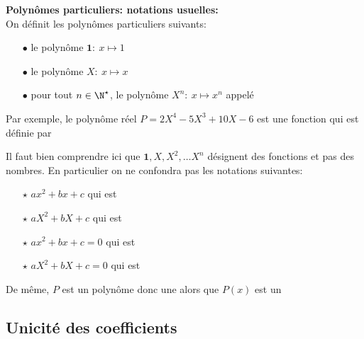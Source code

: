 \documentclass[a4paper, 11pt,reqno]{article}
\begin{document}
{\noindent

\begin{defi} \textbf{Polyn\^omes particuliers: notations usuelles:}\\
	\noindent On d\'efinit les polyn\^omes particuliers suivants:
	\begin{itemize}
		\item[$\bullet$] le polyn\^ome $\mathbf{1}:\ x\mapsto 1$\dotfill \vsec
		\item[$\bullet$] le polyn\^ome $X:\ x\mapsto x$ \dotfill \vsec
		\item[$\bullet$] pour tout $n\in\N^{\star}$, le polyn\^ome $X^n:\ x\mapsto x^n$ appel\'e \dotfill\vsec
	\end{itemize}

\end{defi}

}\vsec

\noindent Par exemple, le polyn\^ome r\'eel $P=2X^4-5X^3+10X-6$ est une fonction qui est d\'efinie par\\\vspace{2cm}


\begin{rem} \noindent \warning  Il faut bien comprendre ici que $\mathbf{1},X,X^2,\dots X^n$ d\'esignent des fonctions et pas des nombres. En particulier on ne confondra pas les notations suivantes:\\
	\begin{itemize}
		\item[$\star$] $ax^2+bx+c$  qui est \dotfill\vsec
		\item[$\star$] $aX^2+bX+c$  qui est \dotfill\vsec
		\item[$\star$] $ax^2+bx+c=0$  qui est \dotfill\vsec
		\item[$\star$] $aX^2+bX+c=0$  qui est \dotfill\vsec
	\end{itemize}
	De m\^{e}me, $P$ est un polyn\^{o}me donc une \dotfill alors que $P(x)$ est un \dotfill
\end{rem}


\subsection{Unicit\'e des coefficients}
\end{document}
